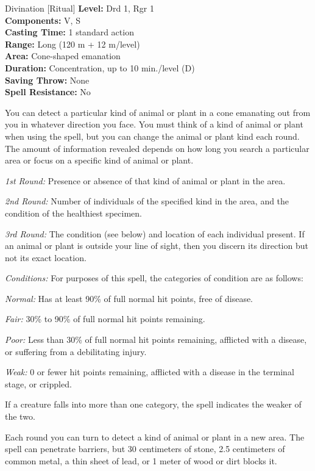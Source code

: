 {Divination [Ritual]}
{
	\textbf{Level:}
	Drd 1, Rgr 1\\
	\textbf{Components:}
	V, S\\
	\textbf{Casting Time:}
	1 standard action\\
	\textbf{Range:}
	Long (120 m + 12 m/level)\\
	\textbf{Area:}
	Cone-shaped emanation\\
	\textbf{Duration:}
	Concentration, up to 10 min./level (D)\\
	\textbf{Saving Throw:}
	None\\
	\textbf{Spell Resistance:}
	No\\
}
{
	You can detect a particular kind of animal or plant in a cone emanating out from you in whatever direction you face. You must think of a kind of animal or plant when using the spell, but you can change the animal or plant kind each round. The amount of information revealed depends on how long you search a particular area or focus on a specific kind of animal or plant.

	\textit{1st Round:}
	Presence or absence of that kind of animal or plant in the area.

	\textit{2nd Round:}
	Number of individuals of the specified kind in the area, and the condition of the healthiest specimen.

	\textit{3rd Round:}
	The condition (see below) and location of each individual present. If an animal or plant is outside your line of sight, then you discern its direction but not its exact location.

	\textit{Conditions:}
	For purposes of this spell, the categories of condition are as follows:

	\emph{Normal:}
	Has at least 90\% of full normal hit points, free of disease.

	\emph{Fair:}
	30\% to 90\% of full normal hit points remaining.

	\emph{Poor:}
	Less than 30\% of full normal hit points remaining, afflicted with a disease, or suffering from a debilitating injury.

	\emph{Weak:}
	0 or fewer hit points remaining, afflicted with a disease in the terminal stage, or crippled.

	If a creature falls into more than one category, the spell indicates the weaker of the two.

	Each round you can turn to detect a kind of animal or plant in a new area. The spell can penetrate barriers, but 30 centimeters of stone, 2.5 centimeters of common metal, a thin sheet of lead, or 1 meter of wood or dirt blocks it.

}

